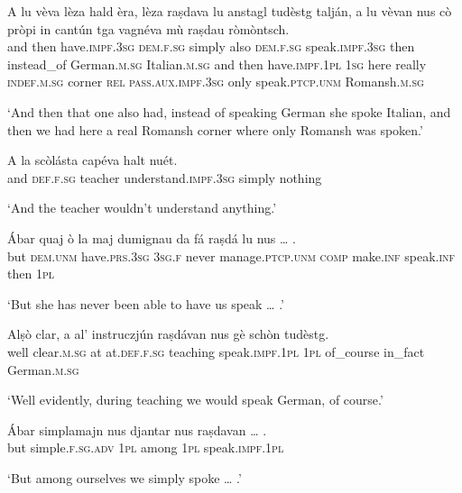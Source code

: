 \largerpage
\begin{linenumbers}
\gll A lu vèva lèza hald èra, lèza raṣdava lu anstagl tudèstg talján, a lu vèvan nus cò pròpi in cantún tga vagnéva mù raṣdau ròmòntsch.\\
and then have.\textsc{impf.3sg} \textsc{dem.f.sg} simply also \textsc{dem.f.sg} speak.\textsc{impf.3sg} then instead\_of German.\textsc{m.sg} Italian.\textsc{m.sg} and then have.\textsc{impf.1pl} \textsc{1sg} here really \textsc{indef.m.sg} corner \textsc{rel} \textsc{pass.aux.impf.3sg} only speak.\textsc{ptcp.unm} Romansh.\textsc{m.sg} \\
\end{linenumbers}
\medskip
\glt `And then that one also had, instead of speaking German she spoke Italian, and then we had here a real Romansh corner where only Romansh was spoken.'
\medskip

\begin{linenumbers}
\gll    A la scòlásta capéva halt nuét.\\
and \textsc{def.f.sg} teacher understand.\textsc{impf.3sg} simply nothing\\
\end{linenumbers}
\medskip
\glt `And the teacher wouldn’t understand anything.'

\clearpage

\begin{linenumbers}
\gll    Ábar quaj ò la maj dumignau da fá raṣdá lu nus … .\\
but \textsc{dem.unm} have.\textsc{prs.3sg} \textsc{3sg.f} never manage.\textsc{ptcp.unm} \textsc{comp} make.\textsc{inf} speak.\textsc{inf} then \textsc{1pl}\\
\end{linenumbers}
\medskip
\glt `But she has never been able to have us speak … .'
\medskip

\begin{linenumbers}
\gll    Alṣò clar, a al’ instruczjún raṣdávan nus gè schòn tudèstg.\\
well clear.\textsc{m.sg} at at.\textsc{def.f.sg} teaching speak.\textsc{impf.1pl} \textsc{1pl} of\_course in\_fact German.\textsc{m.sg}\\
\end{linenumbers}
\medskip
\glt `Well evidently, during teaching we would  speak German, of course.'
\medskip

\begin{linenumbers}
\gll    Ábar simplamajn nus djantar nus raṣdavan … .\\
but simple.\textsc{f.sg.adv} \textsc{1pl} among \textsc{1pl} speak.\textsc{impf.1pl}\\
\end{linenumbers}
\medskip
\glt `But among ourselves we simply spoke … .'
\medskip

